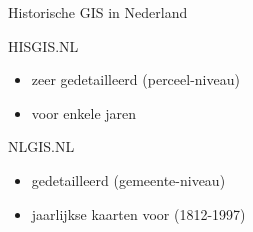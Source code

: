 \documentclass[ignorenonframetext,]{beamer}
\begin{document}
\begin{frame}{Historische GIS in Nederland}

\begin{block}{HISGIS.NL}

\begin{itemize}
\itemsep1pt\parskip0pt
\item
  zeer gedetailleerd (perceel-niveau)
\item
  voor enkele jaren
\end{itemize}

\end{block}

\begin{block}{NLGIS.NL}

\begin{itemize}
\itemsep1pt\parskip0pt
\item
  gedetailleerd (gemeente-niveau)
\item
  jaarlijkse kaarten voor (1812-1997)
\end{itemize}

\end{block}

\end{frame}
\end{document}
